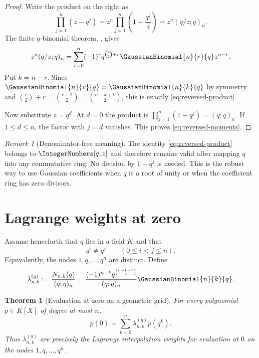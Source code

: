 \documentclass[11pt,a4paper,oneside,openany]{book}
\newtheorem{theorem}{Theorem}[chapter]
\theoremstyle{definition}
\theoremstyle{remark}
\newtheorem{remark}[remark]{Remark}
\begin{document}
\begin{proof}
Write the product on the right as
\[
 \prod_{j=1}^{n}(z-q^j)
 =z^n\prod_{j=1}^{n}\left(1-\frac{q^j}{z}\right)
 =z^n(q/z;q)_n.
\]
The finite $q$-binomial theorem, , gives
\[
 z^n(q/z;q)_n
 =\sum_{r=0}^{n}(-1)^r q^{\binom r2+r}\GaussianBinomial{n}{r}{q} z^{n-r}.
\]
Put $k=n-r$.  Since $\GaussianBinomial{n}{r}{q}=\GaussianBinomial{n}{k}{q}$ by symmetry and
$\binom r2+r=\binom{r+1}{2}=\binom{n-k+1}{2}$, this is exactly
\eqref{eq:reversed-product}.

Now substitute $z=q^d$.  At $d=0$ the product is
$\prod_{j=1}^{n}(1-q^j)=(q;q)_n$.  If $1\le d\le n$, the factor with
$j=d$ vanishes.  This proves \eqref{eq:reversed-moments}.
\end{proof}

\begin{remark}[Denominator-free meaning]\label{rem:denominator-free-reversed}
The identity \eqref{eq:reversed-product} belongs to $\IntegerNumbers[q,z]$ and therefore remains valid after mapping $q$ into any commutative ring.  No division by $1-q^j$ is needed.  This is the robust way to use Gaussian coefficients when $q$ is a root of unity or when the coefficient ring has zero divisors.
\end{remark}

\section{Lagrange weights at zero}

Assume henceforth that $q$ lies in a field $K$ and that
\[
 q^i\ne q^j\qquad(0\le i<j\le n).
\]
Equivalently, the nodes $1,q,\ldots,q^n$ are distinct.  Define
\begin{equation}\label{eq:geometric-lagrange-weight}
 \lambda_{n,k}^{(q)}
 :=\frac{N_{n,k}(q)}{(q;q)_n}
 =\frac{(-1)^{n-k}q^{\binom{n-k+1}{2}}}{(q;q)_n}\GaussianBinomial{n}{k}{q}.
\end{equation}

\begin{theorem}[Evaluation at zero on a geometric grid]\label{thm:geometric-evaluation-zero}
For every polynomial $p\in K[X]$ of degree at most $n$,
\begin{equation}\label{eq:geometric-eval-zero}
 p(0)=\sum_{k=0}^{n}\lambda_{n,k}^{(q)}p(q^k).
\end{equation}
Thus $\lambda_{n,k}^{(q)}$ are precisely the Lagrange interpolation weights for evaluation at $0$ on the nodes $1,q,\ldots,q^n$.
\end{theorem}
\end{document}
